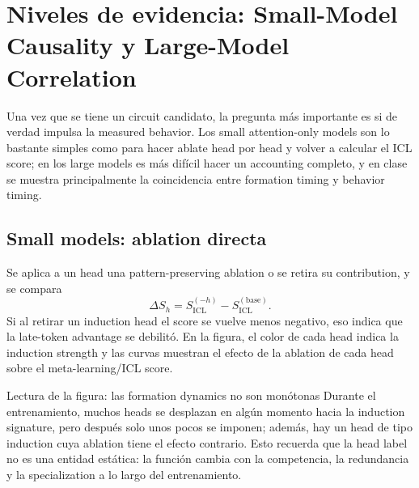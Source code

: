 \section{Niveles de evidencia: Small-Model Causality y Large-Model Correlation}

Una vez que se tiene un circuit candidato, la pregunta más importante es si de verdad impulsa la measured behavior. Los small attention-only models son lo bastante simples como para hacer ablate head por head y volver a calcular el ICL score; en los large models es más difícil hacer un accounting completo, y en clase se muestra principalmente la coincidencia entre formation timing y behavior timing.

\subsection{Small models: ablation directa}

Se aplica a un head una pattern-preserving ablation o se retira su contribution, y se compara
\[
\Delta S_h
=S_{\mathrm{ICL}}^{(-h)}-S_{\mathrm{ICL}}^{(\mathrm{base})}.
\]
Si al retirar un induction head el score se vuelve menos negativo, eso indica que la late-token advantage se debilitó. En la figura, el color de cada head indica la induction strength y las curvas muestran el efecto de la ablation de cada head sobre el meta-learning/ICL score.


\begin{knowledgebox}{Lectura de la figura: las formation dynamics no son monótonas}
Durante el entrenamiento, muchos heads se desplazan en algún momento hacia la induction signature, pero después solo unos pocos se imponen; además, hay un head de tipo induction cuya ablation tiene el efecto contrario. Esto recuerda que la head label no es una entidad estática: la función cambia con la competencia, la redundancia y la specialization a lo largo del entrenamiento.
\end{knowledgebox}


